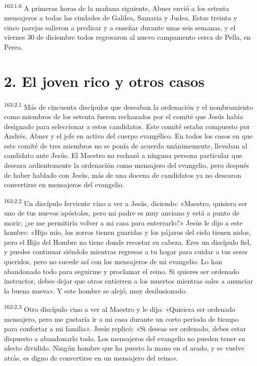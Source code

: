 \par 
\textsuperscript{163:1.6} A primeras horas de la mañana siguiente, Abner envió a los setenta mensajeros a todas las ciudades de Galilea, Samaria y Judea. Estas treinta y cinco parejas salieron a predicar y a enseñar durante unas seis semanas, y el viernes 30 de diciembre todos regresaron al nuevo campamento cerca de Pella, en Perea.

\section*{2. El joven rico y otros casos}
\par 
\textsuperscript{163:2.1} Más de cincuenta discípulos que deseaban la ordenación y el nombramiento como miembros de los setenta fueron rechazados por el comité que Jesús había designado para seleccionar a estos candidatos. Este comité estaba compuesto por Andrés, Abner y el jefe en activo del cuerpo evangélico. En todos los casos en que este comité de tres miembros no se ponía de acuerdo unánimemente, llevaban al candidato ante Jesús. El Maestro no rechazó a ninguna persona particular que deseara ardientemente la ordenación como mensajero del evangelio, pero después de haber hablado con Jesús, más de una docena de candidatos ya no desearon convertirse en mensajeros del evangelio.

\par 
\textsuperscript{163:2.2} Un discípulo ferviente vino a ver a Jesús, diciendo: «Maestro, quisiera ser uno de tus nuevos apóstoles, pero mi padre es muy anciano y está a punto de morir; ¿se me permitiría volver a mi casa para enterrarlo?» Jesús le dijo a este hombre: «Hijo mío, los zorros tienen guaridas y los pájaros del cielo tienen nidos, pero el Hijo del Hombre no tiene donde recostar su cabeza. Eres un discípulo fiel, y puedes continuar siéndolo mientras regresas a tu hogar para cuidar a tus seres queridos, pero no sucede así con los mensajeros de mi evangelio. Lo han abandonado todo para seguirme y proclamar el reino. Si quieres ser ordenado instructor, debes dejar que otros entierren a los muertos mientras sales a anunciar la buena nueva». Y este hombre se alejó, muy desilusionado.

\par 
\textsuperscript{163:2.3} Otro discípulo vino a ver al Maestro y le dijo: «Quisiera ser ordenado mensajero, pero me gustaría ir a mi casa durante un corto período de tiempo para confortar a mi familia». Jesús replicó: «Si deseas ser ordenado, debes estar dispuesto a abandonarlo todo. Los mensajeros del evangelio no pueden tener su afecto dividido. Ningún hombre que ha puesto la mano en el arado, y se vuelve atrás, es digno de convertirse en un mensajero del reino».

